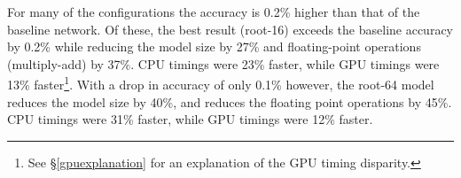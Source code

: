 \documentclass[thesis]{subfiles}
\begin{document}
	For many of the configurations the accuracy is 0.2\% higher than that of the baseline network. Of these, the best result (root-16) exceeds the baseline accuracy by 0.2\% while reducing the model size by 27\% and floating-point operations (multiply-add) by 37\%. CPU timings were 23\% faster, while GPU timings were 13\% faster\footnote{See \S\ref{gpuexplanation} for an explanation of the GPU timing disparity.}. With a drop in accuracy of only 0.1\% however, the root-64 model reduces the model size by 40\%, and reduces the floating point operations by 45\%. CPU timings were 31\% faster, while GPU timings were 12\% faster. 
	
\begin{figure}[tbp]
	\centering
	\begin{subfigure}[b]{\columnwidth}
		\gdatatable
		\alldatatable
		\codatatable
		
		

\end{subfigure}
\end{figure}
\end{document}
